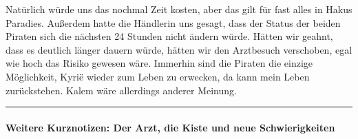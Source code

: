 \documentclass[11pt]{article}
\begin{document}
Natürlich würde uns das nochmal Zeit kosten, aber das gilt für fast
alles in Hakus Paradies. Außerdem hatte die Händlerin uns gesagt, dass
der Status der beiden Piraten sich die nächsten 24 Stunden nicht ändern
würde. Hätten wir geahnt, dass es deutlich länger dauern würde, hätten
wir den Arztbesuch verschoben, egal wie hoch das Risiko gewesen wäre.
Immerhin sind die Piraten die einzige Möglichkeit, Kyrië wieder zum
Leben zu erwecken, da kann mein Leben zurückstehen. Kalem wäre
allerdings anderer Meinung.

\begin{center}\rule{3in}{0.4pt}\end{center}

\paragraph{Weitere Kurznotizen: Der Arzt, die Kiste und neue
Schwierigkeiten}
\end{document}
